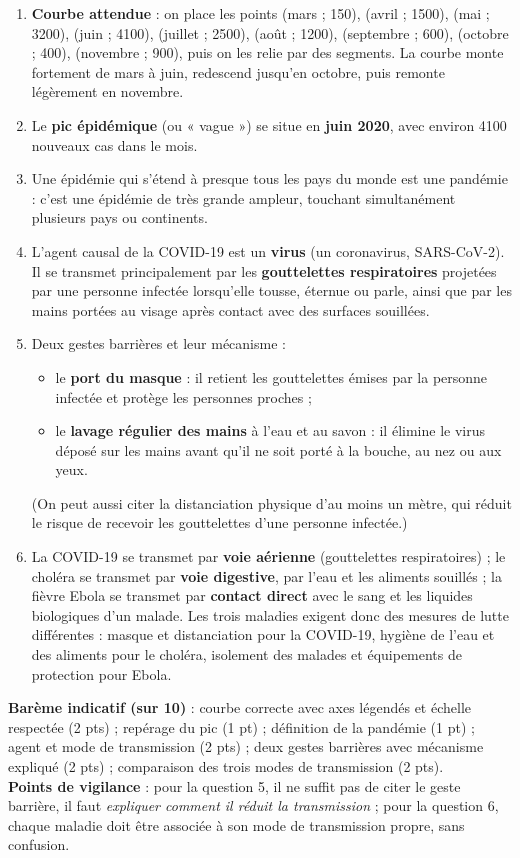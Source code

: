 \documentclass[11pt]{article}
\newcommand{\cle}[1]{{\popxbold\color{popdark}#1}}
\begin{document}
\begin{corrige}
\begin{enumerate}
\item \textbf{Courbe attendue} : on place les points (mars ; 150), (avril ; \num{1500}), (mai ; \num{3200}), (juin ; \num{4100}), (juillet ; \num{2500}), (août ; \num{1200}), (septembre ; 600), (octobre ; 400), (novembre ; 900), puis on les relie par des segments. La courbe monte fortement de mars à juin, redescend jusqu'en octobre, puis remonte légèrement en novembre.
\item Le \textbf{pic épidémique} (ou « vague ») se situe en \textbf{juin 2020}, avec environ \num{4100} nouveaux cas dans le mois.
\item Une épidémie qui s'étend à presque tous les pays du monde est une \cle{pandémie} : c'est une épidémie de très grande ampleur, touchant simultanément plusieurs pays ou continents.
\item L'agent causal de la COVID-19 est un \textbf{virus} (un coronavirus, SARS-CoV-2). Il se transmet principalement par les \textbf{gouttelettes respiratoires} projetées par une personne infectée lorsqu'elle tousse, éternue ou parle, ainsi que par les mains portées au visage après contact avec des surfaces souillées.
\item Deux gestes barrières et leur mécanisme :
\begin{itemize}
\item le \textbf{port du masque} : il retient les gouttelettes émises par la personne infectée et protège les personnes proches ;
\item le \textbf{lavage régulier des mains} à l'eau et au savon : il élimine le virus déposé sur les mains avant qu'il ne soit porté à la bouche, au nez ou aux yeux.
\end{itemize}
(On peut aussi citer la distanciation physique d'au moins un mètre, qui réduit le risque de recevoir les gouttelettes d'une personne infectée.)
\item La COVID-19 se transmet par \textbf{voie aérienne} (gouttelettes respiratoires) ; le choléra se transmet par \textbf{voie digestive}, par l'eau et les aliments souillés ; la fièvre Ebola se transmet par \textbf{contact direct} avec le sang et les liquides biologiques d'un malade. Les trois maladies exigent donc des mesures de lutte différentes : masque et distanciation pour la COVID-19, hygiène de l'eau et des aliments pour le choléra, isolement des malades et équipements de protection pour Ebola.
\end{enumerate}
\textbf{Barème indicatif (sur 10)} : courbe correcte avec axes légendés et échelle respectée (2 pts) ; repérage du pic (1 pt) ; définition de la pandémie (1 pt) ; agent et mode de transmission (2 pts) ; deux gestes barrières avec mécanisme expliqué (2 pts) ; comparaison des trois modes de transmission (2 pts).\\
\textbf{Points de vigilance} : pour la question 5, il ne suffit pas de citer le geste barrière, il faut \emph{expliquer comment il réduit la transmission} ; pour la question 6, chaque maladie doit être associée à son mode de transmission propre, sans confusion.
\end{corrige}
\end{document}
